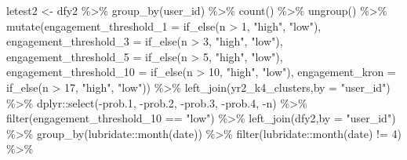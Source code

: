 \documentclass[
]{article}
\newenvironment{Shaded}{\begin{snugshade}}{\end{snugshade}}
\newcommand{\AttributeTok}[1]{\textcolor[rgb]{0.77,0.63,0.00}{#1}}
\newcommand{\DecValTok}[1]{\textcolor[rgb]{0.00,0.00,0.81}{#1}}
\newcommand{\FloatTok}[1]{\textcolor[rgb]{0.00,0.00,0.81}{#1}}
\newcommand{\FunctionTok}[1]{\textcolor[rgb]{0.00,0.00,0.00}{#1}}
\newcommand{\NormalTok}[1]{#1}
\newcommand{\OtherTok}[1]{\textcolor[rgb]{0.56,0.35,0.01}{#1}}
\newcommand{\SpecialCharTok}[1]{\textcolor[rgb]{0.00,0.00,0.00}{#1}}
\newcommand{\StringTok}[1]{\textcolor[rgb]{0.31,0.60,0.02}{#1}}
\begin{document}
\begin{Shaded}
\begin{Highlighting}[]
\NormalTok{ letest2 }\OtherTok{\textless{}{-}}\NormalTok{ dfy2 }\SpecialCharTok{\%\textgreater{}\%}
   \FunctionTok{group\_by}\NormalTok{(user\_id) }\SpecialCharTok{\%\textgreater{}\%}
   \FunctionTok{count}\NormalTok{() }\SpecialCharTok{\%\textgreater{}\%}
   \FunctionTok{ungroup}\NormalTok{() }\SpecialCharTok{\%\textgreater{}\%} 
   \FunctionTok{mutate}\NormalTok{(}\AttributeTok{engagement\_threshold\_1 =} \FunctionTok{if\_else}\NormalTok{(n }\SpecialCharTok{\textgreater{}} \DecValTok{1}\NormalTok{, }\StringTok{"high"}\NormalTok{, }\StringTok{"low"}\NormalTok{),}
          \AttributeTok{engagement\_threshold\_3 =} \FunctionTok{if\_else}\NormalTok{(n }\SpecialCharTok{\textgreater{}} \DecValTok{3}\NormalTok{, }\StringTok{"high"}\NormalTok{, }\StringTok{"low"}\NormalTok{),}
          \AttributeTok{engagement\_threshold\_5 =} \FunctionTok{if\_else}\NormalTok{(n }\SpecialCharTok{\textgreater{}} \DecValTok{5}\NormalTok{, }\StringTok{"high"}\NormalTok{, }\StringTok{"low"}\NormalTok{),}
          \AttributeTok{engagement\_threshold\_10 =} \FunctionTok{if\_else}\NormalTok{(n }\SpecialCharTok{\textgreater{}} \DecValTok{10}\NormalTok{, }\StringTok{"high"}\NormalTok{, }\StringTok{"low"}\NormalTok{),}
          \AttributeTok{engagement\_kron =} \FunctionTok{if\_else}\NormalTok{(n }\SpecialCharTok{\textgreater{}} \DecValTok{17}\NormalTok{, }\StringTok{"high"}\NormalTok{, }\StringTok{"low"}\NormalTok{)) }\SpecialCharTok{\%\textgreater{}\%} 
   \FunctionTok{left\_join}\NormalTok{(yr2\_k4\_clusters,}\AttributeTok{by =} \StringTok{"user\_id"}\NormalTok{) }\SpecialCharTok{\%\textgreater{}\%} 
\NormalTok{   dplyr}\SpecialCharTok{::}\FunctionTok{select}\NormalTok{(}\SpecialCharTok{{-}}\NormalTok{prob}\FloatTok{.1}\NormalTok{,}
                 \SpecialCharTok{{-}}\NormalTok{prob}\FloatTok{.2}\NormalTok{,}
                 \SpecialCharTok{{-}}\NormalTok{prob}\FloatTok{.3}\NormalTok{,}
                 \SpecialCharTok{{-}}\NormalTok{prob}\FloatTok{.4}\NormalTok{,}
                 \SpecialCharTok{{-}}\NormalTok{n) }\SpecialCharTok{\%\textgreater{}\%} 
  \FunctionTok{filter}\NormalTok{(engagement\_threshold\_10 }\SpecialCharTok{==} \StringTok{"low"}\NormalTok{) }\SpecialCharTok{\%\textgreater{}\%}
   \FunctionTok{left\_join}\NormalTok{(dfy2,}\AttributeTok{by =} \StringTok{"user\_id"}\NormalTok{) }\SpecialCharTok{\%\textgreater{}\%}  
   \FunctionTok{group\_by}\NormalTok{(lubridate}\SpecialCharTok{::}\FunctionTok{month}\NormalTok{(date)) }\SpecialCharTok{\%\textgreater{}\%}
   \FunctionTok{filter}\NormalTok{(lubridate}\SpecialCharTok{::}\FunctionTok{month}\NormalTok{(date) }\SpecialCharTok{!=} \DecValTok{4}\NormalTok{) }\SpecialCharTok{\%\textgreater{}\%} 

\end{Highlighting}
\end{Shaded}
\end{document}
